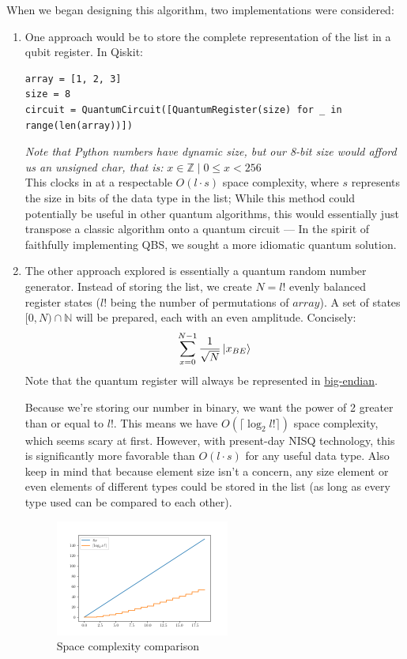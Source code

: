 \documentclass[12pt]{article}
\begin{document}
\noindent When we began designing this algorithm, two implementations were considered:
\begin{enumerate}
\item One approach would be to store the complete representation of the list in a qubit register. In Qiskit:
\begin{verbatim}
array = [1, 2, 3]
size = 8
circuit = QuantumCircuit([QuantumRegister(size) for _ in range(len(array))])
\end{verbatim}
\textit{Note that Python numbers have dynamic size, but our 8-bit size would afford us an unsigned char, that is:}
$ x \in \mathbb{Z} \mid 0 \leq x < 256 $ \\
This clocks in at a respectable $ O(l \cdot s) $ space complexity, where $ s $ represents the size in bits of the data type in the list; While this method could potentially be useful in other quantum algorithms, this would essentially just transpose a classic algorithm onto a quantum circuit --- In the spirit of faithfully implementing QBS, we sought a more idiomatic quantum solution.
 
\item The other approach explored is essentially a quantum random number generator. Instead of storing the list, we create $N = l!$ evenly balanced register states ($l!$ being the number of permutations of $array$). A set of states $[0, N) \cap \mathbb{N}$ will be prepared, each with an even amplitude. Concisely:
    $$ \sum_{x=0}^{N-1} \frac{1}{\sqrt{N}} \ket{x_{BE}} $$
Note that the quantum register will always be represented in \href{https://en.wikipedia.org/wiki/Endianness}{big-endian}.

Because we're storing our number in binary, we want the power of 2 greater than or equal to $l!$. This means we have $O(\lceil \log_2 l! \rceil)$ space complexity, which seems scary at first. However, with present-day NISQ technology, this is significantly more favorable than $O(l \cdot s)$ for any useful data type. Also keep in mind that because element size isn't a concern, any size element or even elements of different types could be stored in the list (as long as every type used can be compared to each other).

\begin{figure}[h]
    \centering
    \includegraphics[width=0.54\textwidth]{images/size_compare.png}
    \caption{Space complexity comparison}
    \label{fig:chart1}
\end{figure}


\end{enumerate}
\end{document}
